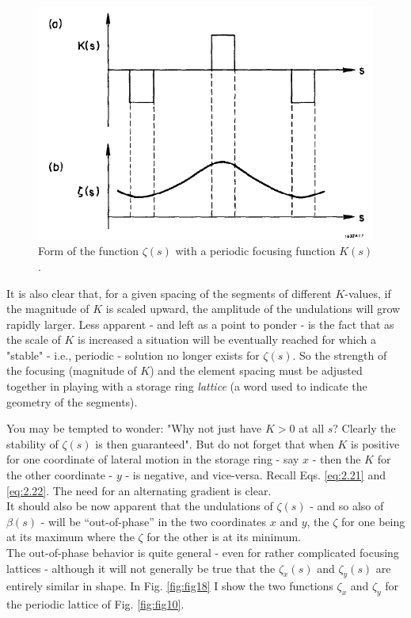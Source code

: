 \begin{figure}[!htb]
	\centering
	\includegraphics[width=0.8\linewidth]{./Figuras/fig17.jpeg}
	\caption{Form of the function $\zeta(s)$ with a periodic focusing function $K(s)$.}
	\label{fig:fig17}
\end{figure}

It is also clear that, for a given spacing of the segments of different $K$-values, if the magnitude of $K$ is scaled upward, the amplitude of the undulations will grow rapidly larger. Less apparent - and left as a point to ponder - is the fact that as the scale of $K$ is increased a situation will be eventually reached for which a "stable" - i.e., periodic - solution no longer exists for $\zeta(s)$. So the strength of the focusing (magnitude of $K$) and the element spacing must be adjusted together in playing with a storage ring \emph{lattice} (a word used to indicate the geometry of the segments).

You may be tempted to wonder: "Why not just have $K > 0$ at all $s$? Clearly the stability of $\zeta(s)$ is then guaranteed". But do not forget that when $K$ is positive for one coordinate
 of lateral motion in the storage ring - say $x$ - then the $K$ for the other coordinate - $y$ - is negative, and vice-versa. Recall Eqs. \eqref{eq:2.21} and \eqref{eq:2.22}. The need for an alternating gradient is clear.\\
It should also be now apparent that the undulations of $\zeta(s)$ - and so also of $\beta(s)$ - will be “out-of-phase” in the two coordinates $x$ and $y$, the $\zeta$ for one being at
its maximum where the $\zeta$ for the other is at its minimum.\\
The out-of-phase behavior is quite general - even for rather complicated focusing lattices - although it will not generally be true that the $\zeta_x(s)$ and $\zeta_y(s)$ are entirely
 similar in shape. In Fig. \ref{fig:fig18} I show the two functions $\zeta_x$ and $\zeta_y$ for the periodic lattice of Fig. \ref{fig:fig10}.

